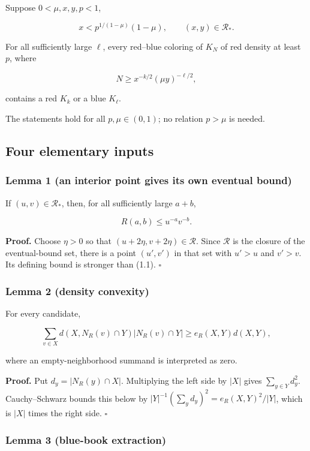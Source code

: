 Suppose \(0<\mu,x,y,p<1\),

\[
x<p^{1/(1-\mu)}(1-\mu),
\qquad (x,y)\in\mathcal R_*.
\tag{B.1}
\]

For all sufficiently large \(\ell\), every red--blue coloring of \(K_N\)
of red density at least \(p\), where

\[
N\ge x^{-k/2}(\mu y)^{-\ell/2},
\tag{B.2}
\]

contains a red \(K_k\) or a blue \(K_\ell\).

The statements hold for all \(p,\mu\in(0,1)\); no relation \(p>\mu\) is
needed.

\subsection{Four elementary inputs}

\subsubsection{Lemma 1 (an interior point gives its own eventual bound)}

If \((u,v)\in\mathcal R_*\), then, for all sufficiently large \(a+b\),

\[
R(a,b)\le u^{-a}v^{-b}.
\tag{1.1}
\]

\textbf{Proof.} Choose \(\eta>0\) so that
\((u+2\eta,v+2\eta)\in\mathcal R\). Since \(\mathcal R\) is the closure
of the eventual-bound set, there is a point \((u',v')\) in that set with
\(u'>u\) and \(v'>v\). Its defining bound is stronger than (1.1).
\(\square\)

\subsubsection{Lemma 2 (density convexity)}

For every candidate,

\[
\sum_{v\in X}d(X,N_R(v)\cap Y)|N_R(v)\cap Y|
\ge e_R(X,Y)d(X,Y),
\tag{2.1}
\]

where an empty-neighborhood summand is interpreted as zero.

\textbf{Proof.} Put \(d_y=|N_R(y)\cap X|\). Multiplying the left side by
\(|X|\) gives \(\sum_{y\in Y}d_y^2\). Cauchy--Schwarz bounds this below
by \(|Y|^{-1}(\sum_y d_y)^2=e_R(X,Y)^2/|Y|\), which is \(|X|\) times the
right side. \(\square\)

\subsubsection{Lemma 3 (blue-book extraction)}

